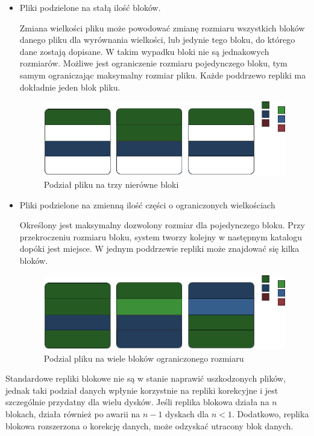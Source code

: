 \begin{itemize}
    \item Pliki podzielone na stałą ilość bloków. 

            Zmiana wielkości pliku może powodować zmianę rozmiaru wszystkich bloków 
            danego pliku dla wyrównania wielkości, 
            lub jedynie tego bloku, do którego dane zostają dopisane. 
            W takim wypadku bloki nie są jednakowych rozmiarów. 
            Możliwe jest ograniczenie rozmiaru pojedynczego bloku, 
            tym samym ograniczając maksymalny rozmiar pliku. 
            Każde poddrzewo repliki ma dokładnie jeden blok pliku.
            \begin{figure}[h!]
                    \centering
                    \includegraphics{BR-1.png}
                    \caption{Podział pliku na trzy nierówne bloki }
                    \label{fig:br1}
            \end{figure}
    \item Pliki podzielone na zmienną ilość części o ograniczonych wielkościach

            Określony jest maksymalny dozwolony rozmiar dla pojedynczego bloku. 
            Przy przekroczeniu rozmiaru bloku, system tworzy kolejny w następnym katalogu 
            dopóki jest miejsce. W jednym poddrzewie repliki może znajdować się kilka bloków. 
            \begin{figure}[h!]
                    \centering
                    \includegraphics{BR-2.png}
                    \caption{Podzial pliku na wiele bloków ograniczonego rozmiaru}
                    \label{fig:br1}
            \end{figure}
 
\end{itemize}
Standardowe repliki blokowe nie są w stanie naprawić uszkodzonych plików, jednak taki podział danych wpłynie korzystnie na repliki korekcyjne i jest szczególnie przydatny dla wielu dysków. Jeśli replika blokowa działa na $n$ blokach, działa również po awarii na $n-1$ dyskach dla $n < 1$. Dodatkowo, replika blokowa rozszerzona o korekcję danych, może odzyskać utracony blok danych.

